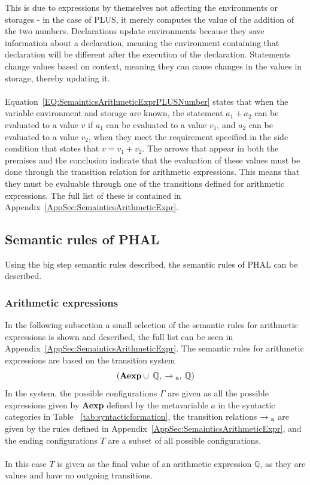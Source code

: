 This is due to expressions by themselves not affecting the environments or storages - in the case of PLUS, it merely computes the value of the addition of the two numbers. 
Declarations update environments because they save information about a declaration, meaning the environment containing that declaration will be different after the execution of the declaration. Statements change values based on context, meaning they can cause changes in the values in storage, thereby updating it.
\\\\
Equation~\ref{EQ:SemainticsArithmeticExprPLUSNumber} states that when the variable environment and storage are known, the statement $a_1 + a_2$ can be evaluated to a value $v$ if $a_1$ can be evaluated to a value $v_1$, and $a_2$ can be evaluated to a value $v_2$, when they meet the requirement specified in the side condition that states that $v = v_1 + v_2$. 
The arrows that appear in both the premises and the conclusion indicate that the evaluation of these values must be done through the transition relation for arithmetic expressions. 
This means that they must be evaluable through one of the transitions defined for arithmetic expressions. The full list of these is contained in Appendix~\ref{AppSec:SemainticsArithmeticExpr}.
\\

\subsection{Semantic rules of PHAL}
Using the big step semantic rules described, the semantic rules of PHAL can be described.
\subsubsection{Arithmetic expressions}\label{sem:aexp}
In the following subsection a small selection of the semantic rules for arithmetic expressions is shown and described, the full list can be seen in Appendix~\ref{AppSec:SemainticsArithmeticExpr}. 
The semantic rules for arithmetic expressions are based on the transition system 
\begin{equation*}
(\textbf{Aexp} \cup \; \mathbb{Q}, \: \xrightarrow{}\textsubscript{a}, \: \mathbb{Q})    
\end{equation*}
In the system, the possible configurations $\Gamma$ are given as all the possible expressions given by \textbf{Aexp} defined by the metavariable $a$ in the syntactic categories in Table~ \ref{tab:syntacticformation}, the transition relations $\xrightarrow{}\textsubscript{a}$ are given by the rules defined in Appendix~\ref{AppSec:SemainticsArithmeticExpr}, and the ending configurations $T$ are a subset of all possible configurations.
\\\\ 
In this case $T$ is given as the final value of an arithmetic expression $\mathbb{Q}$, as they are values and have no outgoing transitions.

